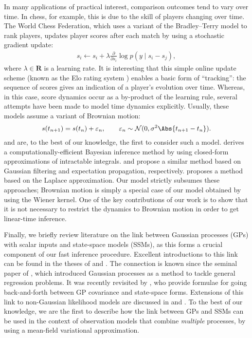In many applications of practical interest, comparison outcomes tend to vary over time.
In chess, for example, this is due to the skill of players changing over time.
The World Chess Federation, which uses a variant of the Bradley--Terry model to rank players, updates player scores after each match by using a stochastic gradient update:
\begin{align*}
s_i \gets s_i + \lambda \frac{\partial}{\partial s_i} \log p(y \mid s_i - s_j),
\end{align*}
where $\lambda \in \mathbf{R}$ is a learning rate.
It is interesting that this simple online update scheme (known as the Elo rating system \citep{elo1978rating}) enables a basic form of ``tracking'': the sequence of scores gives an indication of a player's evolution over time.
Whereas, in this case, score dynamics occur as a by-product of the learning rule, several attempts have been made to model time dynamics explicitly.
Usually, these models assume a variant of Brownian motion:
\begin{align}
\label{eq:brownian}
s(t_{n+1}) = s(t_n) + \varepsilon_{n},
    \qquad \varepsilon_{n} \sim \mathcal{N}(0, \sigma^2 \Abs{t_{n+1} - t_n}).
\end{align}
\citet{glickman1993paired} and \citet{fahrmeir1994dynamic} are, to the best of our knowledge, the first to consider such a model.
\citet{glickman1999parameter} derives a computationally-efficient Bayesian inference method by using closed-form approximations of intractable integrals.
\citet{herbrich2006trueskill} and \citet{dangauthier2007trueskill} propose a similar method based on Gaussian filtering and expectation propagation, respectively.
\citet{coulom2008whole} proposes a method based on the Laplace approximation.
Our model strictly subsumes these approaches; Brownian motion is simply a special case of our model obtained by using the Wiener kernel.
One of the key contributions of our work is to show that it is not necessary to restrict the dynamics to Brownian motion in order to get linear-time inference.

Finally, we briefly review literature on the link between Gaussian processes (GPs) with scalar inputs and state-space models (SSMs), as this forms a crucial component of our fast inference procedure.
Excellent introductions to this link can be found in the theses of \citet{saatci2012scalable} and \citet{solin2016stochastic}.
The connection is known since the seminal paper of \citet{ohagan1978curve}, which introduced Gaussian processes as a method to tackle general regression problems.
It was recently revisited by \citet{hartikainen2010kalman}, who provide formulae for going back-and-forth between GP covariance and state-space forms.
Extensions of this link to non-Gaussian likelihood models are discussed in \citet{saatci2012scalable} and \citet{nickisch2018state}.
To the best of our knowledge, we are the first to describe how the link between GPs and SSMs can be used in the context of observation models that combine \emph{multiple} processes, by using a mean-field variational approximation.
